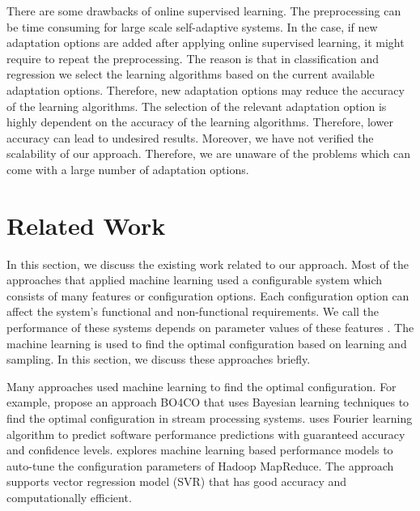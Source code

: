 \documentclass[a4paper,12pt]{article}
\begin{document}
There are some drawbacks of online supervised learning. The preprocessing can be time consuming for large scale self-adaptive systems. In the case, if new adaptation options are added after applying online supervised learning, it might require to repeat the preprocessing. The reason is that in classification and regression we select the learning algorithms based on the current available adaptation options. Therefore, new adaptation options may reduce the accuracy of the learning algorithms. The selection of the relevant adaptation option is highly dependent on the accuracy of the learning algorithms. Therefore, lower accuracy can lead to undesired results. Moreover, we have not verified the scalability of our approach. Therefore, we are unaware of the problems which can come with a large number of adaptation options.
\newpage
\section{Related Work} \label{RealtedWork}
In this section, we discuss the existing work related to our approach. Most of the approaches that applied machine learning used a configurable system which consists of many features or configuration options. Each configuration option can affect the system's functional and non-functional requirements. We call the performance of these systems depends on parameter values of these features \cite{CESFPPOCS-2015}. The machine learning is used to find the optimal configuration based on learning and sampling. In this section, we discuss these approaches briefly.

Many approaches used machine learning to find the optimal configuration. For example, \cite{AUAATOCOSPS-2016} propose an approach BO4CO that uses Bayesian learning techniques to find the optimal configuration in stream processing systems. \cite{PPOCSSBFL-2015} uses Fourier learning algorithm to predict software performance predictions with guaranteed accuracy and confidence levels. \cite{TMLBATOMR-2013} explores machine learning based performance models to auto-tune the configuration parameters of Hadoop MapReduce. The approach supports vector regression model (SVR) that has good accuracy and computationally efficient.
\end{document}
